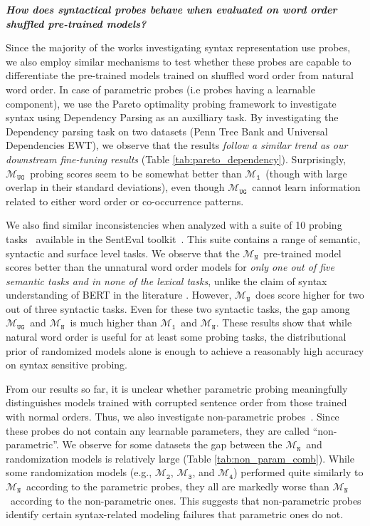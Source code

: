 \documentclass[12pt]{article}
\newcommand{\xit}[1]{{\noindent\textbf{\textit{#1}}}}
\newcommand{\OR}{$\mathcal{M}_{\texttt{N}}$}
\newcommand{\RI}{$\mathcal{M}_{\texttt{1}}$}
\newcommand{\RII}{$\mathcal{M}_{\texttt{2}}$}
\newcommand{\RIII}{$\mathcal{M}_{\texttt{3}}$}
\newcommand{\RIV}{$\mathcal{M}_{\texttt{4}}$}
\newcommand{\RC}{$\mathcal{M}_{\texttt{UG}}$}
\begin{document}
\xit{How does syntactical probes behave when evaluated on word order shuffled pre-trained models?}



Since the majority of the works investigating syntax representation use probes, we also employ similar mechanisms to test whether these probes are capable to differentiate the pre-trained models trained on shuffled word order from natural word order. In case of parametric probes (i.e probes having a learnable component), we use the Pareto optimality probing framework \cite{pimentel2020b} to investigate syntax using Dependency Parsing as an auxilliary task. By investigating the Dependency parsing task on two datasets (Penn Tree Bank and Universal Dependencies EWT), we observe that the results \textit{follow a similar trend as our downstream fine-tuning results} (Table \ref{tab:pareto_dependency}). Surprisingly, \RC\ probing scores seem to be somewhat better than \RI\ (though with large overlap in their standard deviations), even though \RC\ cannot learn information related to either word order or co-occurrence patterns.



We also find similar inconsistencies when analyzed with a suite of 10 probing tasks~\cite{conneau-etal-2018-cram} available in the SentEval toolkit~\cite{conneau-kiela-2018-senteval}. This suite contains a range of semantic, syntactic and surface level tasks. We observe that the \OR\ pre-trained model scores better than the unnatural word order models for \textit{only one out of five semantic tasks and in none of the lexical tasks}, unlike the claim of syntax understanding of BERT in the literature \cite{jawahar2019a}. However, \OR\ does score higher for two out of three syntactic tasks. Even for these two syntactic tasks, the gap among \RC\ and \OR\ is much higher than \RI\ and \OR. These results show that while natural word order is useful for at least some probing tasks, the distributional prior of randomized models alone is enough to achieve a reasonably high accuracy on syntax sensitive probing.

From our results so far, it is unclear whether parametric probing meaningfully distinguishes models trained with corrupted sentence order from those trained with normal orders. Thus, we also investigate non-parametric probes~\cite{linzen-etal-2016-assessing,marvin-linzen-2018-targeted,gulordava2018,goldberga,wolf2019}. Since these probes do not contain any learnable parameters, they are called ``non-parametric''. We observe for some datasets \cite{linzen-etal-2016-assessing,marvin-linzen-2018-targeted} the gap between the \OR\ and randomization models is relatively large (Table \ref{tab:non_param_comb}).
While some randomization models (e.g., \RII, \RIII, and \RIV) performed quite similarly to \OR\ according to the parametric probes, they all are markedly worse than \OR\ according to the non-parametric ones. This suggests that non-parametric probes identify certain syntax-related modeling failures
that parametric ones do not.
\end{document}
